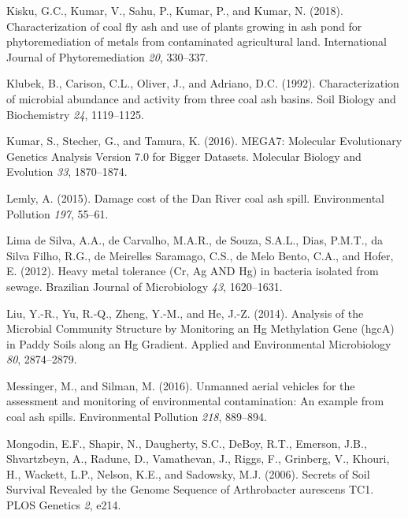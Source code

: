 \documentclass[ms, hidelinks]{uncgdissertationexp}
\theoremstyle{plain}
\theoremstyle{definition}
\theoremstyle{remark}
\begin{document}
\leavevmode\hypertarget{ref-kiskuCharacterizationCoalFly2018}{}%
Kisku, G.C., Kumar, V., Sahu, P., Kumar, P., and Kumar, N. (2018). Characterization of coal fly ash and use of plants growing in ash pond for phytoremediation of metals from contaminated agricultural land. International Journal of Phytoremediation \emph{20}, 330--337.

\leavevmode\hypertarget{ref-klubekCharacterizationMicrobialAbundance1992}{}%
Klubek, B., Carison, C.L., Oliver, J., and Adriano, D.C. (1992). Characterization of microbial abundance and activity from three coal ash basins. Soil Biology and Biochemistry \emph{24}, 1119--1125.

\leavevmode\hypertarget{ref-kumarMEGA7MolecularEvolutionary2016}{}%
Kumar, S., Stecher, G., and Tamura, K. (2016). MEGA7: Molecular Evolutionary Genetics Analysis Version 7.0 for Bigger Datasets. Molecular Biology and Evolution \emph{33}, 1870--1874.

\leavevmode\hypertarget{ref-lemlyDamageCostDan2015}{}%
Lemly, A. (2015). Damage cost of the Dan River coal ash spill. Environmental Pollution \emph{197}, 55--61.

\leavevmode\hypertarget{ref-limadesilvaHeavyMetalTolerance2012}{}%
Lima de Silva, A.A., de Carvalho, M.A.R., de Souza, S.A.L., Dias, P.M.T., da Silva Filho, R.G., de Meirelles Saramago, C.S., de Melo Bento, C.A., and Hofer, E. (2012). Heavy metal tolerance (Cr, Ag AND Hg) in bacteria isolated from sewage. Brazilian Journal of Microbiology \emph{43}, 1620--1631.

\leavevmode\hypertarget{ref-liuAnalysisMicrobialCommunity2014}{}%
Liu, Y.-R., Yu, R.-Q., Zheng, Y.-M., and He, J.-Z. (2014). Analysis of the Microbial Community Structure by Monitoring an Hg Methylation Gene (hgcA) in Paddy Soils along an Hg Gradient. Applied and Environmental Microbiology \emph{80}, 2874--2879.

\leavevmode\hypertarget{ref-messingerUnmannedAerialVehicles2016}{}%
Messinger, M., and Silman, M. (2016). Unmanned aerial vehicles for the assessment and monitoring of environmental contamination: An example from coal ash spills. Environmental Pollution \emph{218}, 889--894.

\leavevmode\hypertarget{ref-mongodinSecretsSoilSurvival2006}{}%
Mongodin, E.F., Shapir, N., Daugherty, S.C., DeBoy, R.T., Emerson, J.B., Shvartzbeyn, A., Radune, D., Vamathevan, J., Riggs, F., Grinberg, V., Khouri, H., Wackett, L.P., Nelson, K.E., and Sadowsky, M.J. (2006). Secrets of Soil Survival Revealed by the Genome Sequence of Arthrobacter aurescens TC1. PLOS Genetics \emph{2}, e214.
\end{document}

